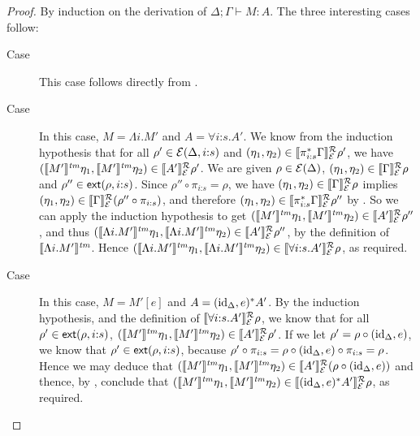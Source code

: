 \begin{proof}
  By induction on the derivation of $\Delta; \Gamma \vdash M : A$. The
  three interesting cases follow:
  \begin{description}
  \item[Case ] This case follows directly from
    .
  \item[Case ] In this case, $M = \Lambda i.M'$ and
    $A = \forall i\mathord:s. A'$. We know from the induction
    hypothesis that for all $\rho' \in \mathcal{E}(\Delta,
    i\mathord:s)$ and $(\eta_1,\eta_2) \in
    \llbracket \pi_{i\mathord:s}^*\Gamma \rrbracket^{\mathcal{R}}_{\mathcal{E}}{\rho'}$, we have
    $(\llbracket M' \rrbracket^{\mathit{tm}}\eta_1,\llbracket M' \rrbracket^{\mathit{tm}}\eta_2) \in
    \llbracket A' \rrbracket^{\mathcal{R}}_{\mathcal{E}}{\rho'}$. We are given $\rho \in
    \mathcal{E}(\Delta)$, $(\eta_1,\eta_2) \in
    \llbracket \Gamma \rrbracket^{\mathcal{R}}_{\mathcal{E}}{\rho}$ and $\rho'' \in
    \mathsf{ext}(\rho,i\mathord:s)$. Since $\rho'' \circ
    \pi_{i\mathord:s} = \rho$, we have $(\eta_1,\eta_2) \in
    \llbracket \Gamma \rrbracket^{\mathcal{R}}_{\mathcal{E}}{\rho}$ implies $(\eta_1,\eta_2) \in
    \llbracket \Gamma \rrbracket^{\mathcal{R}}_{\mathcal{E}}{(\rho'' \circ \pi_{i\mathord:s})}$, and
    therefore $(\eta_1,\eta_2) \in
    \llbracket \pi_{i\mathord:s}^*\Gamma \rrbracket^{\mathcal{R}}_{\mathcal{E}}{\rho''}$ by
    . So we can apply the induction
    hypothesis to get $(\llbracket M' \rrbracket^{\mathit{tm}}\eta_1, \llbracket M' \rrbracket^{\mathit{tm}}\eta_2) \in
    \llbracket A' \rrbracket^{\mathcal{R}}_{\mathcal{E}}{\rho''}$, and thus $(\llbracket \Lambda
      i.M' \rrbracket^{\mathit{tm}}\eta_1,\llbracket \Lambda i.M' \rrbracket^{\mathit{tm}}\eta_2) \in
    \llbracket A' \rrbracket^{\mathcal{R}}_{\mathcal{E}}{\rho}''$, by the definition of $\llbracket \Lambda
      i. M' \rrbracket^{\mathit{tm}}$. Hence $(\llbracket \Lambda i.M' \rrbracket^{\mathit{tm}}\eta_1,\llbracket \Lambda
      i.M' \rrbracket^{\mathit{tm}}\eta_2) \in \llbracket \forall
      i\mathord:s. A' \rrbracket^{\mathcal{R}}_{\mathcal{E}}{\rho}$, as required.
  \item[Case ] In this case, $M = M'[e]$ and $A =
    (\mathrm{id}_\Delta, e)^*A'$. By the induction hypothesis, and the
    definition of $\llbracket \forall i\mathord:s.A' \rrbracket^{\mathcal{R}}_{\mathcal{E}}{\rho}$, we
    know that for all $\rho' \in \mathsf{ext}(\rho,i\mathord:s)$,
    $(\llbracket M' \rrbracket^{\mathit{tm}}\eta_1, \llbracket M' \rrbracket^{\mathit{tm}}\eta_2) \in
    \llbracket A' \rrbracket^{\mathcal{R}}_{\mathcal{E}}{\rho'}$. If we let $\rho' = \rho \circ
    (\mathrm{id}_\Delta, e)$, we know that $\rho' \in
    \mathsf{ext}(\rho,i\mathord:s)$, because $\rho' \circ
    \pi_{i\mathord:s} = \rho \circ (\mathrm{id}_\Delta, e) \circ
    \pi_{i\mathord:s} = \rho$. Hence we may deduce that
    $(\llbracket M' \rrbracket^{\mathit{tm}}\eta_1,\llbracket M' \rrbracket^{\mathit{tm}}\eta_2) \in
    \llbracket A' \rrbracket^{\mathcal{R}}_{\mathcal{E}}{(\rho \circ (\mathrm{id}_\Delta,e))}$ and thence, by
    , conclude that $(\llbracket M' \rrbracket^{\mathit{tm}}\eta_1,
    \llbracket M' \rrbracket^{\mathit{tm}}\eta_2) \in \llbracket (\mathrm{id}_\Delta,e)^*A' \rrbracket^{\mathcal{R}}_{\mathcal{E}}{\rho}$,
    as required.

\end{description}
\end{proof}
